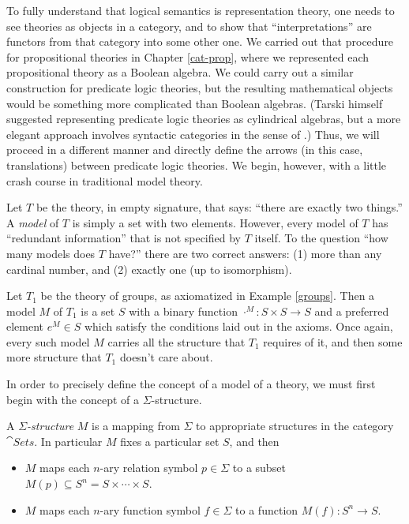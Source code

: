 To fully understand that logical semantics is representation theory,
one needs to see theories as objects in a category, and to show that
``interpretations'' are functors from that category into some other
one.  We carried out that procedure for propositional theories in
Chapter \ref{cat-prop}, where we represented each propositional theory
as a Boolean algebra.  We could carry out a similar construction for
predicate logic theories, but the resulting mathematical objects would
be something more complicated than Boolean algebras.  (Tarski himself
suggested representing predicate logic theories as cylindrical
algebras, but a more elegant approach involves syntactic categories in
the sense of \cite{makkai}.)  Thus, we will proceed in a different
manner and directly define the arrows (in this case, translations)
between predicate logic theories.  We begin, however, with a little
crash course in traditional model theory.

\begin{example} Let $T$ be the theory, in empty signature, that says:
  ``there are exactly two things.''  A \emph{model} of $T$ is simply a
  set with two elements.  However, every model of $T$ has ``redundant
  information'' that is not specified by $T$ itself.  To the question
  ``how many models does $T$ have?'' there are two correct answers:
  (1) more than any cardinal number, and (2) exactly one (up to
  isomorphism).  \end{example}

\begin{example} Let $T_1$ be the theory of groups, as axiomatized in
  Example \ref{groups}.  Then a model $M$ of $T_1$ is a set $S$ with a
  binary function $\cdot ^M:S\times S\to S$ and a preferred element
  $e^M\in S$ which satisfy the conditions laid out in the axioms.
  Once again, every such model $M$ carries all the structure that
  $T_1$ requires of it, and then some more structure that $T_1$
  doesn't care about.  \end{example}

In order to precisely define the concept of a model of a theory, we
must first begin with the concept of a $\Sigma$-structure.

\begin{defn} A \emph{$\Sigma$-structure} $M$ is a mapping from
  $\Sigma$ to appropriate structures in the category $\cat{Sets}$.  In
  particular $M$ fixes a particular set $S$, and then
  \begin{itemize}
  \item $M$ maps each $n$-ary relation symbol $p\in \Sigma$ to a
    subset $M(p)\subseteq S^n=S\times \cdots \times S$.
  \item $M$ maps each $n$-ary function symbol $f\in \Sigma$ to a
    function $M(f):S^n\to S$.
  \end{itemize} \label{sigstr}
\end{defn}

